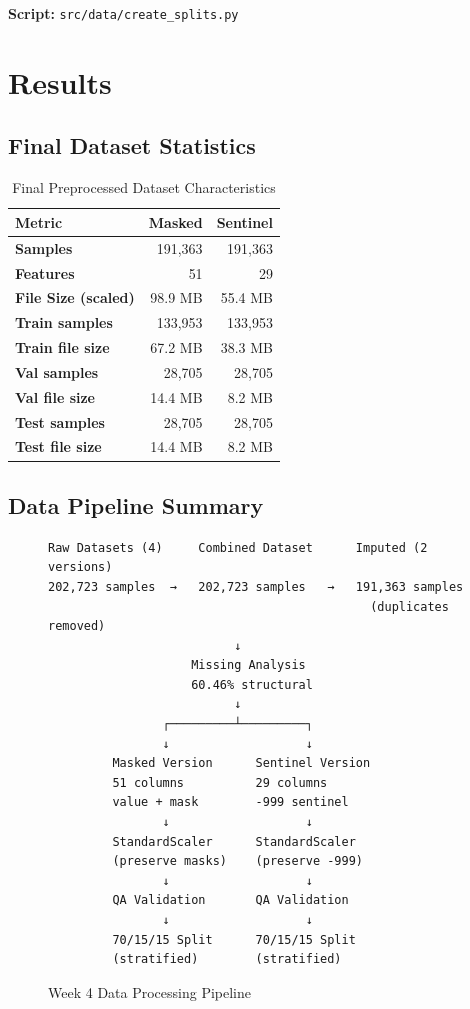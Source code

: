\documentclass[12pt,a4paper]{article}
\begin{document}
\textbf{Script:} \texttt{src/data/create\_splits.py}

\section{Results}

\subsection{Final Dataset Statistics}

\begin{table}[H]
\centering
\caption{Final Preprocessed Dataset Characteristics}
\begin{tabular}{lrr}
\toprule
\textbf{Metric} & \textbf{Masked} & \textbf{Sentinel} \\
\midrule
\textbf{Samples} & 191,363 & 191,363 \\
\textbf{Features} & 51 & 29 \\
\textbf{File Size (scaled)} & 98.9 MB & 55.4 MB \\
\midrule
\textbf{Train samples} & 133,953 & 133,953 \\
\textbf{Train file size} & 67.2 MB & 38.3 MB \\
\midrule
\textbf{Val samples} & 28,705 & 28,705 \\
\textbf{Val file size} & 14.4 MB & 8.2 MB \\
\midrule
\textbf{Test samples} & 28,705 & 28,705 \\
\textbf{Test file size} & 14.4 MB & 8.2 MB \\
\bottomrule
\end{tabular}
\end{table}

\subsection{Data Pipeline Summary}

\begin{figure}[H]
\centering
\begin{verbatim}
Raw Datasets (4)     Combined Dataset      Imputed (2 versions)
202,723 samples  →   202,723 samples   →   191,363 samples
                                             (duplicates removed)
                          ↓
                    Missing Analysis
                    60.46% structural
                          ↓
                ┌─────────┴─────────┐
                ↓                   ↓
         Masked Version      Sentinel Version
         51 columns          29 columns
         value + mask        -999 sentinel
                ↓                   ↓
         StandardScaler      StandardScaler
         (preserve masks)    (preserve -999)
                ↓                   ↓
         QA Validation       QA Validation
                ↓                   ↓
         70/15/15 Split      70/15/15 Split
         (stratified)        (stratified)
\end{verbatim}
\caption{Week 4 Data Processing Pipeline}
\end{figure}
\end{document}
